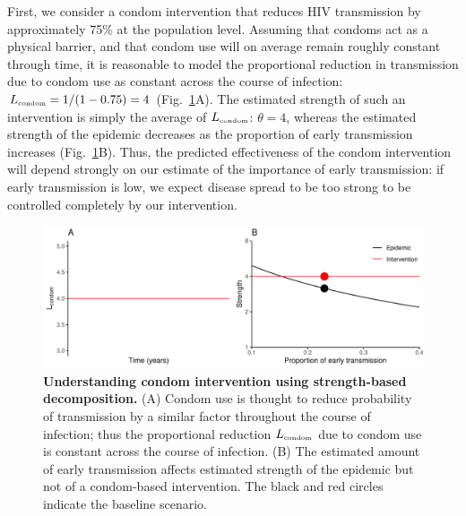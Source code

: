 \documentclass[12pt]{article}
\newcommand{\tsub}[2]{#1_{{\textrm{\tiny #2}}}}
\newcommand{\figref}[1]{Fig.~\ref{fig:#1}}
\newcommand{\figlab}[1]{\label{fig:#1}}
\begin{document}
First, we consider a condom intervention that reduces HIV transmission by approximately 75\% at the population level.
Assuming that condoms act as a physical barrier, and that condom use will on average remain roughly constant through time, it is reasonable to model the proportional reduction in transmission due to condom use as constant across the course of infection: $\tsub{L}{condom} = 1/(1-0.75) = 4$  (\figref{condom}A).
The estimated strength of such an intervention is simply the average of $\tsub{L}{condom}$: $\theta=4$, whereas the estimated strength of the epidemic decreases as the proportion of early transmission increases (\figref{condom}B).
Thus, the predicted effectiveness of the condom intervention will depend strongly on our estimate of the importance of early transmission: if early transmission is low, we expect disease spread to be too strong to be controlled completely by our intervention.

\begin{figure}[!t]
\includegraphics[width=\textwidth]{../figure/condom.pdf}
\caption{
\textbf{Understanding condom intervention using strength-based decomposition.}
(A) Condom use is thought to reduce probability of transmission by a similar factor throughout the course of infection; thus the proportional reduction $\tsub{L}{condom}$ due to condom use is constant across the course of infection.
(B) The estimated amount of early transmission affects estimated strength of the epidemic but not of a condom-based intervention.
The black and red circles indicate the baseline scenario.
}
\figlab{condom}
\end{figure}
\end{document}
